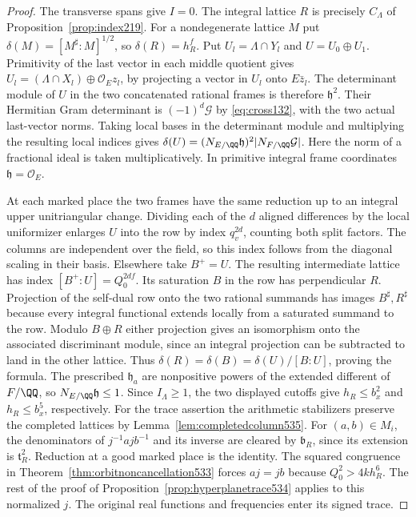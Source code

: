 \documentclass[a4paper,11pt]{article}
\theoremstyle{definition}
\theoremstyle{remark}
\numberwithin{equation}{section}
\begin{document}
\begin{proof}
The transverse spans give \(I=0\). The integral lattice \(R\)
is precisely \(C_\Lambda\) of Proposition~\ref{prop:index219}.
For a nondegenerate lattice \(M\) put
\(\delta(M)=[M^\sharp:M]^{1/2}\), so \(\delta(R)=h_R^f\).
Put \(U_l=\Lambda\cap Y_l\) and \(U=U_0\oplus U_1\).
Primitivity of the last vector in each middle quotient gives
\(U_l=(\Lambda\cap X_l)\oplus\mathcal O_Ez_l\), by projecting
a vector in \(U_l\) onto \(E\bar z_l\). The determinant module
of \(U\) in the two concatenated rational frames is therefore
\(\mathfrak h^2\). Their Hermitian Gram determinant is
\((-1)^d\mathcal G\) by \eqref{eq:cross132}, with the two
actual last-vector norms. Taking local bases in the determinant
module and multiplying the resulting local indices gives
\(\delta(U)=(N_{E/\QQ}\mathfrak h)^2|N_{F/\QQ}\mathcal G|\).
Here the norm of a fractional ideal is taken multiplicatively.
In primitive integral frame coordinates \(\mathfrak h=\mathcal O_E\).

At each marked place the two frames have the same reduction
up to an integral upper unitriangular change. Dividing each of
the \(d\) aligned differences by the local uniformizer enlarges
\(U\) into the row by index \(q_v^{2d}\), counting both split
factors. The columns are independent over the field, so this
index follows from the diagonal scaling in their basis.
Elsewhere take \(B^+=U\). The resulting intermediate lattice
has index \([B^+:U]=Q_0^{2df}\). Its saturation \(B\) in the
row has perpendicular \(R\). Projection of the self-dual row
onto the two rational summands has images \(B^\sharp,R^\sharp\)
because every integral functional extends locally from a saturated
summand to the row. Modulo \(B\oplus R\) either projection gives
an isomorphism onto the associated discriminant module, since an
integral projection can be subtracted to land in the other lattice.
Thus \(\delta(R)=\delta(B)=\delta(U)/[B:U]\), proving the formula.
The prescribed \(\mathfrak h_a\) are nonpositive powers of the
extended different of \(F/\QQ\), so \(N_{E/\QQ}\mathfrak h\le1\).
Since \(I_\Lambda\ge1\), the two displayed cutoffs give
\(h_R\le b_x^2\) and \(h_R\le b_x^5\), respectively.
For the trace assertion the arithmetic stabilizers preserve
the completed lattices by Lemma~\ref{lem:completedcolumn535}.
For \((a,b)\in M_i\), the denominators of \(j^{-1}ajb^{-1}\)
and its inverse are cleared by \(\mathfrak b_R\), since its
extension is \(\mathfrak t_R^2\). Reduction at a good marked
place is the identity. The squared congruence in
Theorem~\ref{thm:orbitnoncancellation533} forces \(aj=jb\)
because \(Q_0^2>4k h_R^6\). The rest of the proof of
Proposition~\ref{prop:hyperplanetrace534} applies to this
normalized \(j\). The original real functions and frequencies
enter its signed trace.
\end{proof}
\end{document}
